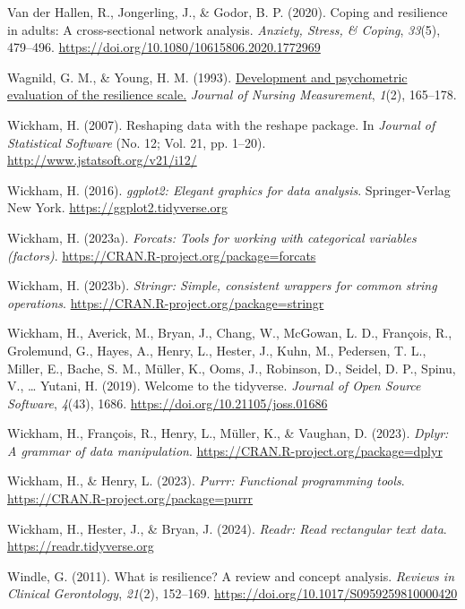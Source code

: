 \documentclass[
  man,floatsintext]{apa7}
\newlength{\cslhangindent}
\newenvironment{CSLReferences}[2] %
 {\begin{list}{}{%
  \setlength{\itemindent}{0pt}
  \setlength{\leftmargin}{0pt}
  \setlength{\parsep}{0pt}
  \ifodd #1
   \setlength{\leftmargin}{\cslhangindent}
   \setlength{\itemindent}{-1\cslhangindent}
  \fi
  \setlength{\itemsep}{#2\baselineskip}}}
 {\end{list}}
\begin{document}
\begin{CSLReferences}{1}{0}
Van der Hallen, R., Jongerling, J., \& Godor, B. P. (2020). Coping and resilience in adults: A cross-sectional network analysis. \emph{Anxiety, Stress, \& Coping}, \emph{33}(5), 479--496. \url{https://doi.org/10.1080/10615806.2020.1772969}

Wagnild, G. M., \& Young, H. M. (1993). \href{https://www.ncbi.nlm.nih.gov/pubmed/7850498}{Development and psychometric evaluation of the resilience scale.} \emph{Journal of Nursing Measurement}, \emph{1}(2), 165--178.

Wickham, H. (2007). Reshaping data with the {reshape} package. In \emph{Journal of Statistical Software} (No. 12; Vol. 21, pp. 1--20). \url{http://www.jstatsoft.org/v21/i12/}

Wickham, H. (2016). \emph{ggplot2: Elegant graphics for data analysis}. Springer-Verlag New York. \url{https://ggplot2.tidyverse.org}

Wickham, H. (2023a). \emph{Forcats: Tools for working with categorical variables (factors)}. \url{https://CRAN.R-project.org/package=forcats}

Wickham, H. (2023b). \emph{Stringr: Simple, consistent wrappers for common string operations}. \url{https://CRAN.R-project.org/package=stringr}

Wickham, H., Averick, M., Bryan, J., Chang, W., McGowan, L. D., François, R., Grolemund, G., Hayes, A., Henry, L., Hester, J., Kuhn, M., Pedersen, T. L., Miller, E., Bache, S. M., Müller, K., Ooms, J., Robinson, D., Seidel, D. P., Spinu, V., \ldots{} Yutani, H. (2019). Welcome to the {tidyverse}. \emph{Journal of Open Source Software}, \emph{4}(43), 1686. \url{https://doi.org/10.21105/joss.01686}

Wickham, H., François, R., Henry, L., Müller, K., \& Vaughan, D. (2023). \emph{Dplyr: A grammar of data manipulation}. \url{https://CRAN.R-project.org/package=dplyr}

Wickham, H., \& Henry, L. (2023). \emph{Purrr: Functional programming tools}. \url{https://CRAN.R-project.org/package=purrr}

Wickham, H., Hester, J., \& Bryan, J. (2024). \emph{Readr: Read rectangular text data}. \url{https://readr.tidyverse.org}

Windle, G. (2011). What is resilience? {A} review and concept analysis. \emph{Reviews in Clinical Gerontology}, \emph{21}(2), 152--169. \url{https://doi.org/10.1017/S0959259810000420}

\end{CSLReferences}
\end{document}
